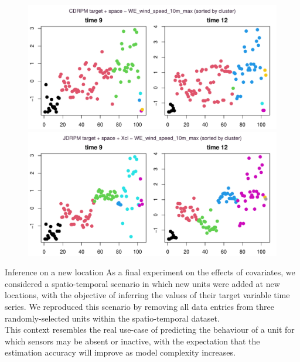 \documentclass[
	11pt, %
 xcolor={dvipsnames,svgnames}
]{beamer}
\begin{document}
\begin{frame}
    \begin{figure}
        \centering
        \includegraphics[width=0.7\linewidth]{imgs/WE_wind_speed_10m_max_CDRPM_sorted_ZOOM.pdf}\\
        \includegraphics[width=0.7\linewidth]{imgs/WE_wind_speed_10m_max_JDRPM_sorted_ZOOM.pdf}
    \end{figure}
\end{frame}


\begin{frame}{Inference on a new location}
As a final experiment on the effects of covariates, we considered a spatio-temporal scenario in which new units were added at new locations, with the objective of inferring the values of their target variable time series. We reproduced this scenario by removing all data entries from three randomly-selected units within the spatio-temporal dataset.\\[6pt]
This context resembles the real use-case of predicting the behaviour of a unit for which sensors may be absent or inactive, with the expectation that the estimation accuracy will improve as model complexity increases. 
\end{frame}
\end{document}
